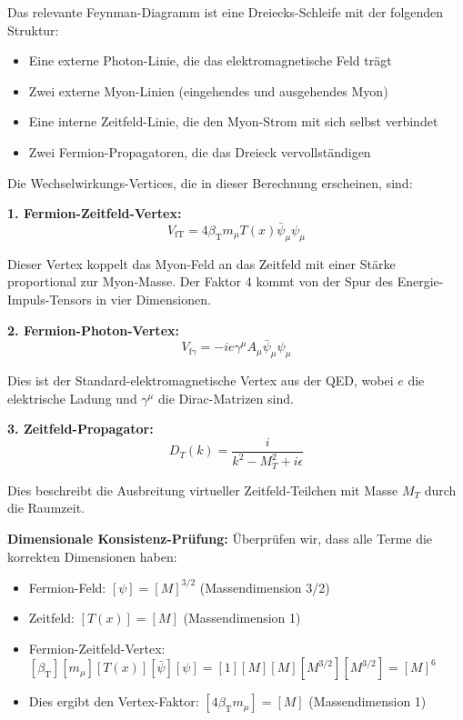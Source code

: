 \documentclass[12pt,a4paper]{article}
\newcommand{\Tfield}{T(x)}
\newcommand{\betaT}{\beta_{\text{T}}}
\begin{document}
	Das relevante Feynman-Diagramm ist eine Dreiecks-Schleife mit der folgenden Struktur:
	\begin{itemize}
		\item Eine externe Photon-Linie, die das elektromagnetische Feld trägt
		\item Zwei externe Myon-Linien (eingehendes und ausgehendes Myon)
		\item Eine interne Zeitfeld-Linie, die den Myon-Strom mit sich selbst verbindet
		\item Zwei Fermion-Propagatoren, die das Dreieck vervollständigen
	\end{itemize}
	
	Die Wechselwirkungs-Vertices, die in dieser Berechnung erscheinen, sind:
	
	\textbf{1. Fermion-Zeitfeld-Vertex:}
	\begin{equation}
		V_{\text{fT}} = 4\betaT m_{\mu} \Tfield \bar{\psi}_{\mu} \psi_{\mu}
	\end{equation}
	
	Dieser Vertex koppelt das Myon-Feld an das Zeitfeld mit einer Stärke proportional zur Myon-Masse. Der Faktor 4 kommt von der Spur des Energie-Impuls-Tensors in vier Dimensionen.
	
	\textbf{2. Fermion-Photon-Vertex:}
	\begin{equation}
		V_{\text{f}\gamma} = -ie\gamma^{\mu} A_{\mu} \bar{\psi}_{\mu} \psi_{\mu}
	\end{equation}
	
	Dies ist der Standard-elektromagnetische Vertex aus der QED, wobei $e$ die elektrische Ladung und $\gamma^{\mu}$ die Dirac-Matrizen sind.
	
	\textbf{3. Zeitfeld-Propagator:}
	\begin{equation}
		D_T(k) = \frac{i}{k^2 - M_T^2 + i\epsilon}
	\end{equation}
	
	Dies beschreibt die Ausbreitung virtueller Zeitfeld-Teilchen mit Masse $M_T$ durch die Raumzeit.
	
	\textbf{Dimensionale Konsistenz-Prüfung:}
	Überprüfen wir, dass alle Terme die korrekten Dimensionen haben:
	\begin{itemize}
		\item Fermion-Feld: $[\psi] = [M]^{3/2}$ (Massendimension 3/2)
		\item Zeitfeld: $[\Tfield] = [M]$ (Massendimension 1)
		\item Fermion-Zeitfeld-Vertex: $[\betaT][m_{\mu}][\Tfield][\bar{\psi}][\psi] = [1][M][M][M^{3/2}][M^{3/2}] = [M]^6$
		\item Dies ergibt den Vertex-Faktor: $[4\betaT m_{\mu}] = [M]$ (Massendimension 1)
	\end{itemize}
	
\end{document}
